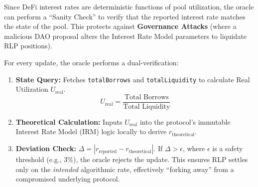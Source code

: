 \documentclass[12pt]{article}
\begin{document}
Since DeFi interest rates are deterministic functions of pool utilization, the oracle can perform a ``Sanity Check'' to verify that the reported interest rate matches the state of the pool. This protects against \textbf{Governance Attacks} (where a malicious DAO proposal alters the Interest Rate Model parameters to liquidate RLP positions).

For every update, the oracle performs a dual-verification:

\begin{enumerate}
    \item \textbf{State Query:} Fetches \texttt{totalBorrows} and \texttt{totalLiquidity} to calculate Real Utilization $U_{\text{real}}$.
    \begin{equation}
        U_{\text{real}} = \frac{\text{Total Borrows}}{\text{Total Liquidity}}
    \end{equation}
    \item \textbf{Theoretical Calculation:} Inputs $U_{\text{real}}$ into the protocol's immutable Interest Rate Model (IRM) logic locally to derive $r_{\text{theoretical}}$.
    \item \textbf{Deviation Check:} $\Delta = |r_{\text{reported}} - r_{\text{theoretical}}|$. If $\Delta > \epsilon$, where $\epsilon$ is a safety threshold (e.g., 3\%), the oracle rejects the update. This ensures RLP settles only on the \emph{intended} algorithmic rate, effectively ``forking away'' from a compromised underlying protocol.
\end{enumerate}
\end{document}
